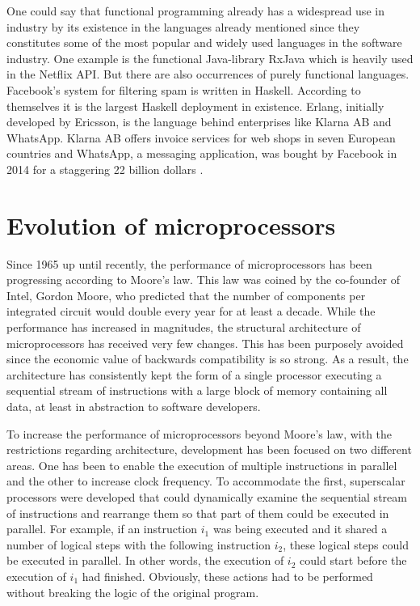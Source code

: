 \documentclass[conference]{IEEEtran}
\begin{document}
One could say that functional programming already has a widespread use in industry by its existence in the languages already mentioned since they constitutes some of the most popular and widely used languages in the software industry. One example is the functional Java-library RxJava which is heavily used in the Netflix API. But there are also occurrences of purely functional languages. Facebook's system for filtering spam is written in Haskell. According to themselves it is the largest Haskell deployment in existence. Erlang, initially developed by Ericsson, is the language behind enterprises like Klarna AB and WhatsApp. Klarna AB offers invoice services for web shops in seven European countries and WhatsApp, a messaging application, was bought by Facebook in 2014 for a staggering 22 billion dollars \cite{how}.

\section{Evolution of microprocessors}

Since 1965 up until recently, the performance of microprocessors has been progressing according to Moore's law. This law was coined by the co-founder of Intel, Gordon Moore, who predicted that the number of components per integrated circuit would double every year for at least a decade. While the performance has increased in magnitudes, the structural architecture of microprocessors has received very few changes. This has been purposely avoided since the economic value of backwards compatibility is so strong. As a result, the architecture has consistently kept the form of a single processor executing a sequential stream of instructions with a large block of memory containing all data, at least in abstraction to software developers.

To increase the performance of microprocessors beyond Moore's law, with the restrictions regarding architecture, development has been focused on two different areas. One has been to enable the execution of multiple instructions in parallel and the other to increase clock frequency. To accommodate the first, superscalar processors were developed that could dynamically examine the sequential stream of instructions and rearrange them so that part of them could be executed in parallel. For example, if an instruction $i_{1}$ was being executed and it shared a number of logical steps with the following instruction $i_{2}$, these logical steps could be executed in parallel. In other words, the execution of $i_{2}$ could start before the execution of $i_{1}$ had finished. Obviously, these actions had to be performed without breaking the logic of the original program.
\end{document}
